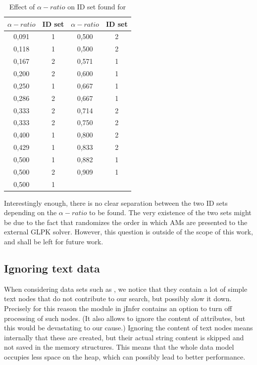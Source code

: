 \begin{table}
  \caption{Effect of $\alpha-ratio$ on ID set found for }
  \bigskip
  \label{table-experiments-various-betas-ova1-ratio-effect}
  \centering
  \begin{tabular}{c | c || c |  c}
    $\alpha-ratio$ & ID set & $\alpha-ratio$ & ID set \\
    \hline
    0,091	& 1 & 0,500	& 2 \\
    0,118	& 1 & 0,500	& 2 \\
    0,167	& 2 & 0,571	& 1 \\
    0,200	& 2 & 0,600	& 1 \\
    0,250	& 1 & 0,667	& 1 \\
    0,286	& 2 & 0,667	& 1 \\
    0,333	& 2 & 0,714	& 2 \\
    0,333	& 2 & 0,750	& 2 \\
    0,400	& 1 & 0,800	& 2 \\
    0,429	& 1 & 0,833	& 2 \\
    0,500	& 1 & 0,882	& 1 \\
    0,500	& 2 & 0,909	& 1 \\
    0,500	& 1 &       &   \\
  \end{tabular}
\end{table}

Interestingly enough, there is no clear separation between the two ID sets depending on the $\alpha-ratio$ to be found. The very existence of the two sets might be due to the fact that  randomizes the order in which AMs are presented to the external GLPK solver. However, this question is outside of the scope of this work, and shall be left for future work.

\subsection{Ignoring text data}


When considering data sets such as , we notice that they contain a lot of simple text nodes that do not contribute to our search, but possibly slow it down. Precisely for this reason the  module in jInfer contains an option to turn off processing of such nodes. (It also allows to ignore the content of attributes, but this would be devastating to our cause.) Ignoring the content of text nodes means internally that these are created, but their actual string content is skipped and not saved in the memory structures. This means that the whole data model occupies less space on the heap, which can possibly lead to better performance.

